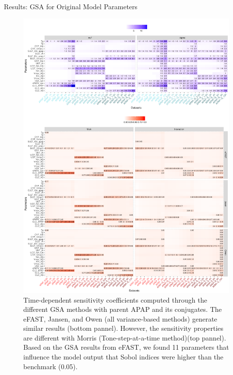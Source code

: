 \documentclass[xcolor=table]{beamer}
\begin{document}
\begin{frame}[t]
\begin{columns}[t]
\begin{column}{0.23\paperwidth}
\begin{block}{Results: GSA for Original Model Parameters}
\begin{figure}
\includegraphics[width=0.98\linewidth]{fig3.pdf}
\caption{Time-dependent sensitivity coefficients computed through the different GSA methods with parent APAP and its conjugates. 
The eFAST, Jansen, and Owen (all variance-based methods) generate similar results (bottom pannel). However, the sensitivity properties are different with Morris (Tone-step-at-a-time method)(top pannel).
Based on the GSA results from eFAST, we found 11 parameters that influence the model output that Sobol indices were higher than the benchmark (0.05).
}
\end{figure}
\end{block}


\end{column} %


\end{columns}
\end{frame}
\end{document}
